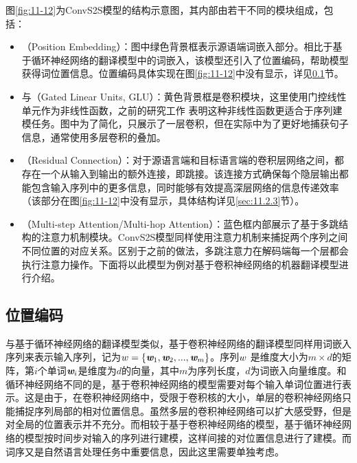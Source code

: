\parinterval 图\ref{fig:11-12}为ConvS2S模型的结构示意图，其内部由若干不同的模块组成，包括：

\begin{itemize}
\item {\small{}}（Position Embedding）：图中绿色背景框表示源语端词嵌入部分。相比于基于循环神经网络的翻译模型中的词嵌入，该模型还引入了位置编码，帮助模型获得词位置信息。位置编码具体实现在图\ref{fig:11-12}中没有显示，详见\ref{sec:11.2.1}节。

\item {\small{}}与{\small{}}（Gated Linear Units, GLU）：黄色背景框是卷积模块，这里使用门控线性单元作为非线性函数，之前的研究工作 表明这种非线性函数更适合于序列建模任务。图中为了简化，只展示了一层卷积，但在实际中为了更好地捕获句子信息，通常使用多层卷积的叠加。

\item {\small{}}（Residual Connection）：对于源语言端和目标语言端的卷积层网络之间，都存在一个从输入到输出的额外连接，即跳接。该连接方式确保每个隐层输出都能包含输入序列中的更多信息，同时能够有效提高深层网络的信息传递效率（该部分在图\ref{fig:11-12}中没有显示，具体结构详见\ref{sec:11.2.3}节）。

\item {\small{}}（Multi-step Attention/Multi-hop Attention）：蓝色框内部展示了基于多跳结构的注意力机制模块。ConvS2S模型同样使用注意力机制来捕捉两个序列之间不同位置的对应关系。区别于之前的做法，多跳注意力在解码端每一个层都会执行注意力操作。下面将以此模型为例对基于卷积神经网络的机器翻译模型进行介绍。
\end{itemize}


\subsection{位置编码}
\label{sec:11.2.1}

\parinterval 与基于循环神经网络的翻译模型类似，基于卷积神经网络的翻译模型同样用词嵌入序列来表示输入序列，记为${w}=\{\textbf{\em w}_1,\textbf{\em w}_2,...,\textbf{\em w}_m\}$。序列${w}$ 是维度大小为$m \times d$的矩阵，第$i$个单词$\textbf{\em w}_i$是维度为$d$的向量，其中$m$为序列长度，$d$为词嵌入向量维度。和循环神经网络不同的是，基于卷积神经网络的模型需要对每个输入单词位置进行表示。这是由于，在卷积神经网络中，受限于卷积核的大小，单层的卷积神经网络只能捕捉序列局部的相对位置信息。虽然多层的卷积神经网络可以扩大感受野，但是对全局的位置表示并不充分。而相较于基于卷积神经网络的模型，基于循环神经网络的模型按时间步对输入的序列进行建模，这样间接的对位置信息进行了建模。而词序又是自然语言处理任务中重要信息，因此这里需要单独考虑。

